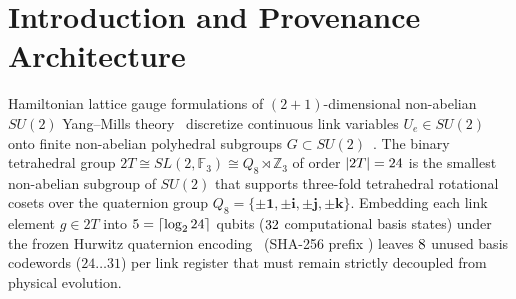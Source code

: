\documentclass[aps,prx,twocolumn,superscriptaddress,nofootinbib]{revtex4-2}
\begin{document}
\begin{abstract}
$+\BTPlaqQSevenExcitationPct$ $|0\rangle\to|1\rangle$ SPAM/readout drift excursion (\texttt{IDENTITY\_CTRL\_0CZ} dropping $\BTPlaqWOnePidOneIdFid \to \BTPlaqWTwoPidOneIdFid$, \texttt{ECHO\_PROBE\_16CZ} dropping $\BTPlaqWOnePidOneEcho \to \BTPlaqWTwoPidOneEcho$). Published calibration remained frozen at the stale Window~1 ranking (\texttt{pid=1} at \#1), collapsing in Window~2 to Spearman $\rho_{\mathrm{cal}} = +\BTPlaqWTwoSpearmanCal$ with $\BTPlaqWTwoRegretCal$ top-1 selection regret, whereas live \texttt{ECHO\_PROBE\_16CZ} detected the \texttt{pid=1} collapse in real time, switched \#1 selection to \texttt{pid=0}, and achieved $\rho_{\mathrm{echo}} = +\BTPlaqWTwoSpearmanEcho$ ($\Delta\rho = +\BTPlaqWTwoDeltaSpearman$ over calibration) with $\BTPlaqWTwoRegretEcho$ top-1 selection regret across both windows (two-window mean $\bar{\rho}_{\mathrm{echo}} = +\BTPlaqTwoWinMeanSpearmanEcho$ versus $\bar{\rho}_{\mathrm{cal}} = +\BTPlaqTwoWinMeanSpearmanCal$, $\Delta\bar{\rho} = +\BTPlaqTwoWinMeanDeltaSpearman$).
\end{abstract}

\maketitle

\section{Introduction and Provenance Architecture}

Hamiltonian lattice gauge formulations of $(2+1)$-dimensional non-abelian $SU(2)$ Yang--Mills theory~\cite{KogutSusskind1975} discretize continuous link variables $U_e \in SU(2)$ onto finite non-abelian polyhedral subgroups $G \subset SU(2)$~\cite{HornKarlinerKatznelson1979,Lamm2019}. The binary tetrahedral group $2T \cong SL(2,\mathbb{F}_3) \cong Q_8 \rtimes \mathbb{Z}_3$ of order $|2T| = 24$ is the smallest non-abelian subgroup of $SU(2)$ that supports three-fold tetrahedral rotational cosets over the quaternion group $Q_8 = \{\pm\mathbf{1}, \pm\mathbf{i}, \pm\mathbf{j}, \pm\mathbf{k}\}$. Embedding each link element $g \in 2T$ into $5 = \lceil\log_2 24\rceil$ qubits ($32$ computational basis states) under the frozen Hurwitz quaternion encoding \BTPlaqEncVer\ (SHA-256 prefix \BTPlaqEncShaPrefix) leaves $8$ unused basis codewords ($24\dots 31$) per link register that must remain strictly decoupled from physical evolution.
\end{document}
